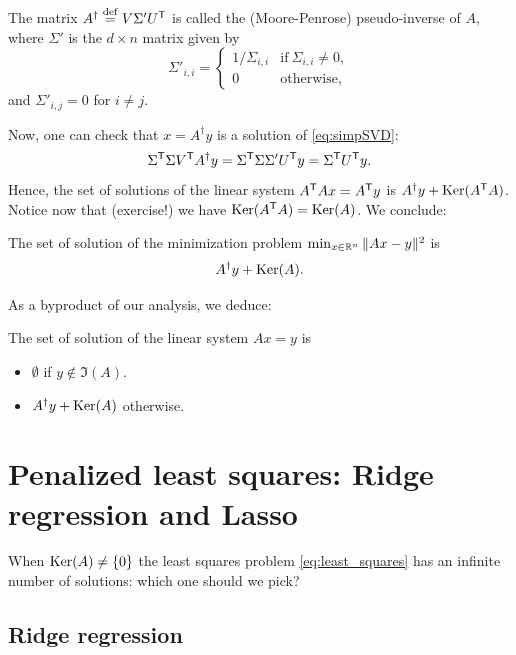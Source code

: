 \documentclass[11pt,nocut]{article}
\begin{document}
\begin{definition}
	The matrix $A^{\dagger} \overset{\rm def}{=} V \Sigma' U^{{\sf T}}$ is called the (Moore-Penrose) pseudo-inverse of $A$, where $\Sigma'$ is the $d \times n$ matrix given by 
	$$
	\Sigma'_{i,i} =
	\begin{cases}
		1 / \Sigma_{i,i} & \text{if} \ \Sigma_{i,i} \neq 0, \\
		0 & \text{otherwise},
	\end{cases}
	$$
	and $\Sigma'_{i,j} = 0$ for $i \neq j$.
\end{definition}

Now, one can check that $x = A^{\dagger}y$ is a solution of \eqref{eq:simpSVD}:
$$
\Sigma^{{\sf T}} \Sigma V^{{\sf T}} A^{\dagger} y =
\Sigma^{{\sf T}} \Sigma \Sigma' U^{{\sf T}} y =
\Sigma^{{\sf T}} U^{{\sf T}} y.
$$
Hence, the set of solutions of the linear system $A^{{\sf T}} A x = A^{{\sf T}} y$ is $A^{\dagger} y + {{\rm Ker}}(A^{{\sf T}}A)$. Notice now that (exercise!) we have ${{\rm Ker}}(A^{{\sf T}} A) = {{\rm Ker}}(A)$.
We conclude:

\begin{proposition}\label{prop:least_squares}
	The set of solution of the minimization problem $\min_{x \in \mathbb{R}^n} \|Ax - y\|^2$ is
	$$
	A^{\dagger} y + {{\rm Ker}}(A).
	$$
\end{proposition}

As a byproduct of our analysis, we deduce:
\begin{corollary}\label{cor:linear_system}
	The set of solution of the linear system $Ax = y$ is
	\begin{itemize}
		\item $\emptyset$ if $y \not\in \Im(A)$.
		\item $A^{\dagger}y + {{\rm Ker}}(A)$ otherwise.
	\end{itemize}
\end{corollary}


\section{Penalized least squares: Ridge regression and Lasso}

When ${{\rm Ker}}(A) \neq \{0\}$ the least squares problem \eqref{eq:least_squares} has an infinite number of solutions: which one should we pick?

\subsection{Ridge regression}
\end{document}
